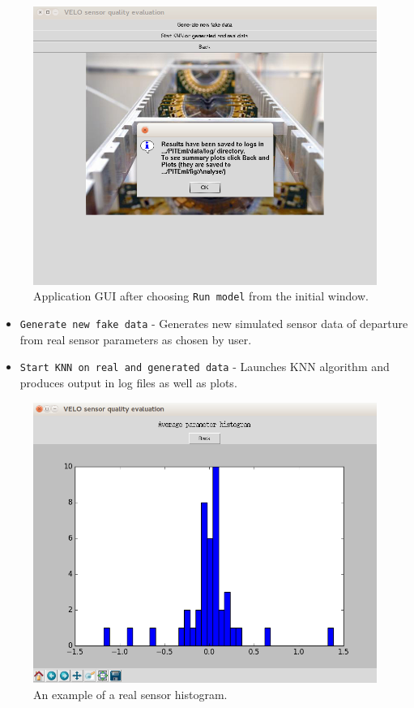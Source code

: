 \documentclass[a4paper,10pt]{article}
\begin{document}
\begin{figure}[H] \centering
    \includegraphics[width=.8\textwidth]{../fig/app_shots/model}
    \caption{Application GUI after choosing \texttt{Run model} from the initial window.}
\end{figure}

\begin{itemize}
    \item \texttt{Generate new fake data} - Generates new simulated sensor data of departure from real sensor parameters as chosen by user.
    \item \texttt{Start KNN on real and generated data} - Launches KNN algorithm and produces output in log files as well as plots.
\end{itemize}


\begin{figure}[H] \centering
    \includegraphics[width=.8\textwidth]{../fig/app_shots/hist}
    \caption{An example of a real sensor histogram.}
\end{figure}

\end{document}
